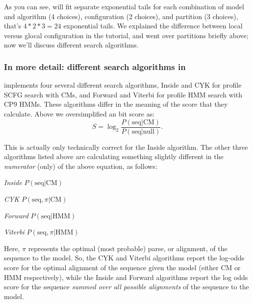 As you can see,  will fit separate exponential tails
for each combination of model and algorithm (4 choices), configuration
(2 choices), and partition (3 choices), that's $4*2*3=24$ exponential
tails. We explained the difference between local versus glocal
configuration in the tutorial, and went over partitions briefly above;
now we'll discuss different search algorithms. 

\subsubsection{In more detail: different search algorithms in }
 implements four several different search 
algorithms, Inside and CYK for profile SCFG search with CMs, and
Forward and Viterbi for profile HMM search with CP9 HMMs.
These algorithms
differ in the meaning of the score that they calculate. Above we
oversimplified an  bit score as:
\[
	S = \log_2 \frac {P( \mbox{seq} | \mbox{CM})} { P (\mbox{seq} |
	\mbox{null})}.
\]

This is actually only technically correct for the Inside
algorithm. The other three algorithms listed above are calculating
something slightly different in the \emph{numerator} (only) of the
above equation, as follows: 

\begin{wideitem}
\item[\em{Inside}]  $P(\mbox{seq}      | \mbox{CM})$
\item[\em{CYK}]     $P(\mbox{seq},\pi  | \mbox{CM})$
\item[\em{Forward}] $P(\mbox{seq}      | \mbox{HMM})$
\item[\em{Viterbi}] $P(\mbox{seq},\pi  | \mbox{HMM})$
\end{wideitem}

Here, $\pi$ represents the optimal (most probable) parse, or
alignment, of the sequence to the model. So, the CYK and Viterbi
algorithms report the log-odds score for the optimal alignment 
of the sequence given the model (either CM or HMM respectively), while
the Inside and Forward algorithms report the log odds score for the
sequence \emph{summed over all possible alignments} of the sequence to
the model. 


